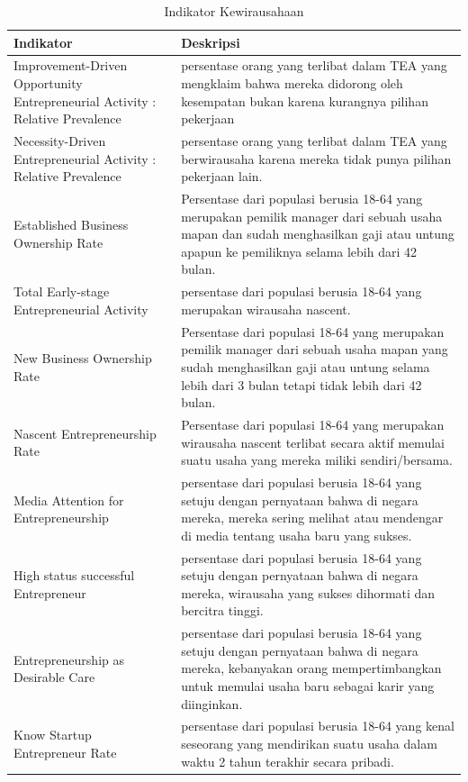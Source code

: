\begin{table}[H]
\centering
\caption{Indikator Kewirausahaan}
\begin{tabular}{|p{3cm}|p{10cm}|}
\hline
Indikator & Deskripsi\\
\hline
Improvement-Driven Opportunity Entrepreneurial Activity : Relative Prevalence & persentase orang yang terlibat dalam TEA yang mengklaim bahwa mereka didorong oleh kesempatan bukan karena kurangnya pilihan pekerjaan\\
\hline
Necessity-Driven Entrepreneurial Activity : Relative Prevalence & persentase orang yang terlibat dalam TEA yang berwirausaha karena mereka tidak punya pilihan pekerjaan lain.\\
\hline
Established Business Ownership Rate & Persentase dari populasi berusia 18-64 yang merupakan pemilik manager dari sebuah usaha mapan dan sudah menghasilkan gaji atau untung apapun ke pemiliknya selama lebih dari 42 bulan.\\
\hline
Total Early-stage Entrepreneurial Activity & persentase dari populasi berusia 18-64 yang merupakan wirausaha nascent.\\
\hline
New Business Ownership Rate & Persentase dari populasi 18-64 yang merupakan pemilik manager dari sebuah usaha mapan yang sudah menghasilkan gaji atau untung selama lebih dari 3 bulan tetapi tidak lebih dari 42 bulan.\\
\hline
Nascent Entrepreneurship Rate & Persentase dari populasi 18-64 yang merupakan wirausaha nascent terlibat secara aktif memulai suatu usaha yang mereka miliki sendiri/bersama.\\
\hline
Media Attention for Entrepreneurship & persentase dari populasi berusia 18-64 yang setuju dengan pernyataan bahwa di negara mereka, mereka sering melihat atau mendengar di media tentang usaha baru yang sukses.\\
\hline
High status successful Entrepreneur & persentase dari populasi berusia 18-64 yang setuju dengan pernyataan bahwa di negara mereka, wirausaha yang sukses dihormati dan bercitra tinggi.\\
\hline
Entrepreneurship as Desirable Care & persentase dari populasi berusia 18-64 yang setuju dengan pernyataan bahwa di negara mereka, kebanyakan orang mempertimbangkan untuk memulai usaha baru sebagai karir yang diinginkan.\\
\hline
Know Startup Entrepreneur Rate & persentase dari populasi berusia 18-64 yang kenal seseorang yang mendirikan suatu usaha dalam waktu 2 tahun terakhir secara pribadi.\\
\hline
\end{tabular}
\label{tabelindikator}
\end{table}



